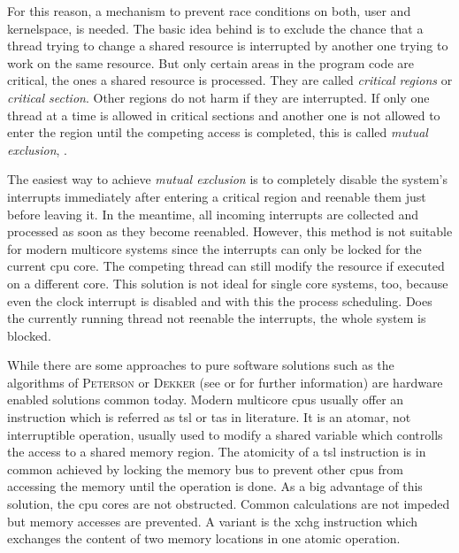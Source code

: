 For this reason, a mechanism to prevent race conditions on both, user and kernelspace, is needed.
The basic idea behind is to exclude the chance that a thread trying to change a shared resource is interrupted by another one trying to work on the same resource\cite{tanenbaum-modern-operating-systems}.
But only certain areas in the program code are critical, the ones a shared resource is processed.
They are called \textit{critical regions} or \textit{critical section}\cite{tanenbaum-modern-operating-systems}.
Other regions do not harm if they are interrupted.
If only one thread at a time is allowed in critical sections and another one is not allowed to enter the region until the competing access is completed, this is called \textit{mutual exclusion}\cite{tanenbaum-modern-operating-systems}, \cite{glatz2015betriebssysteme}.

The easiest way to achieve \textit{mutual exclusion} is to completely disable the system's interrupts immediately after entering a critical region and reenable them just before leaving it.
In the meantime, all incoming interrupts are collected and processed as soon as they become reenabled\cite{achilles2006betriebssysteme}.
However, this method is not suitable for modern multicore systems since the interrupts can only be locked for the current \ac{cpu} core.
The competing thread can still modify the resource if executed on a different core.
This solution is not ideal for single core systems, too, because even the clock interrupt is disabled and with this the process scheduling.
Does the currently running thread not reenable the interrupts, the whole system is blocked\cite{tanenbaum-modern-operating-systems}.

While there are some approaches to pure software solutions such as the algorithms of \textsc{Peterson} or \textsc{Dekker} (see \cite{tanenbaum-modern-operating-systems} or \cite{silberschatz2009operating} for further information) are hardware enabled solutions common today\cite{tanenbaum-modern-operating-systems}.
Modern multicore \acp{cpu} usually offer an instruction which is referred as \ac{tsl} or \ac{tas} in literature.
It is an atomar, not interruptible operation, usually used to modify a shared variable which controlls the access to a shared memory region\cite{tanenbaum-modern-operating-systems}.
The atomicity of a \ac{tsl} instruction is in common achieved by locking the memory bus to prevent other \acp{cpu} from accessing the memory until the operation is done.
As a big advantage of this solution, the \ac{cpu} cores are not obstructed.
Common calculations are not impeded but memory accesses are prevented\cite{tanenbaum-modern-operating-systems}.
A variant is the \ac{xchg} instruction which exchanges the content of two memory locations in one atomic operation\cite{silberschatz2009operating}.

